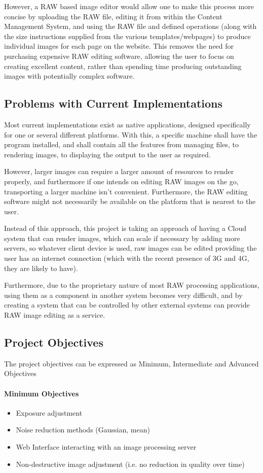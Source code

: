 \documentclass[10pt,a4paper]{article}
\begin{document}
However, a RAW based image editor would allow one to make this process more concise by uploading the RAW file, editing it from within
the Content Management System, and using the RAW file and defined operations (along with the size instructions supplied from the various
templates/webpages) to produce individual images for each page on the website. This removes the need for purchasing expensive RAW editing software,
allowing the user to focus on creating excellent content, rather than spending time producing outstanding images with potentially complex software.

\subsection{Problems with Current Implementations}
Most current implementations exist as native applications, designed specifically for one or several different platforms.
With this, a specific machine shall have the program installed, and shall contain all the features from managing files, to
rendering images, to displaying the output to the user as required. 

However, larger images can require a larger amount of resources to render properly, and furthermore if one intends on editing RAW images
on the go, transporting a larger machine isn't convenient. Furthermore, the RAW editing software might not necessarily be available on the platform
that is nearest to the user. 

Instead of this approach, this project is taking an approach of having a Cloud system that can render images, which can scale if necessary by adding more
servers, so whatever client device is used, raw images can be edited providing the user has an internet connection (which with the recent presence of 3G and 4G,
they are likely to have).

Furthermore, due to the proprietary nature of most RAW processing applications, using them as a component in another system becomes very difficult,
and by creating a system that can be controlled by other external systems can provide RAW image editing as a service.

\subsection{Project Objectives}
The project objectives can be expressed as Minimum, Intermediate and Advanced Objectives


\paragraph{Minimum Objectives}
    \begin{itemize}
      \item Exposure adjustment
      \item Noise reduction methods (Gaussian, mean)
      \item Web Interface interacting with an image processing server
      \item Non-destructive image adjustment (i.e. no reduction in quality over time)
    \end{itemize}
\end{document}
